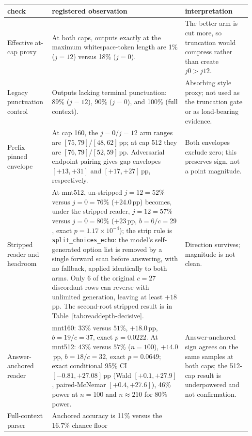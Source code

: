 \begin{table}[H]
\centering
\small
\setlength{\tabcolsep}{3.5pt}
\begin{tabular}{@{}>{\raggedright\arraybackslash}p{}
>{\raggedright\arraybackslash}p{}
>{\raggedright\arraybackslash}p{}@{}}
\toprule
\textbf{check} & \textbf{registered observation} & \textbf{interpretation} \\
\midrule
Effective at-cap proxy & At both caps, outputs exactly at the maximum
whitespace-token length are 1\% ($j=12$) versus 18\% ($j=0$). & The better
arm is cut more, so truncation would compress rather than create $j0>j12$. \\
Legacy punctuation control & Outputs lacking terminal punctuation: 89\%
($j{=}12$), 90\% ($j{=}0$), and 100\% (full context). & Absorbing style proxy;
not used as the truncation gate or as load-bearing evidence. \\
Prefix-pinned envelope & At cap 160, the $j{=}0$/$j{=}12$ arm ranges are
$[75,79]$/$[48,62]$\,pp; at cap 512 they are
$[76,79]$/$[52,59]$\,pp.  Adversarial endpoint pairing gives gap envelopes
$[+13,+31]$ and $[+17,+27]$\,pp, respectively. & Both envelopes exclude zero;
this preserves sign, not a point magnitude. \\
Stripped reader and headroom & At mnt512, un-stripped $j{=}12{=}52\%$
versus $j{=}0{=}76\%$ ($+24.0$\,pp) becomes, under the stripped reader,
$j{=}12{=}57\%$ versus $j{=}0{=}80\%$ ($+23$\,pp, $b{=}6/c{=}29$, exact
$p{=}1.17\times10^{-4}$); the strip rule is
\texttt{split\_choices\_echo}: the model's self-generated option list is
removed by a single forward scan before answering, with no fallback, applied
identically to both arms.  Only 6 of the original $c{=}27$ discordant rows
can reverse with unlimited generation, leaving at least $+18$\,pp.  The
second-root stripped result is in Table~\ref{tab:readdepth-decisive}. &
Direction survives; magnitude is not clean. \\
Answer-anchored reader & mnt160: $33\%$ versus $51\%$, $+18.0$\,pp,
$b{=}19/c{=}37$, exact $p{=}0.0222$.  At mnt512: $43\%$ versus $57\%$
($n{=}100$), $+14.0$\,pp, $b{=}18/c{=}32$, exact $p{=}0.0649$; exact
conditional 95\% CI
$[-0.81,+27.08]$\,pp (Wald $[+0.1,+27.9]$, paired-McNemar
$[+0.4,+27.6]$), 46\% power at $n{=}100$ and $n{\approx}210$ for 80\%
power. & Answer-anchored sign agrees on the same samples at both caps; the
512-cap result is underpowered and not confirmation. \\
Full-context parser & Anchored accuracy is 11\% versus the 16.7\% chance floor

\end{tabular}
\end{table}
